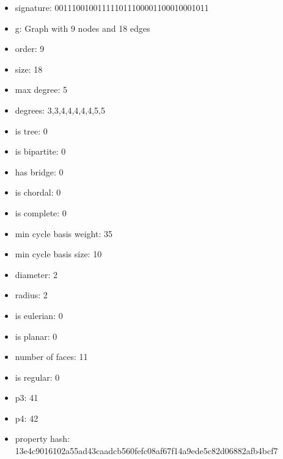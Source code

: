 \newpage
\begin{figure}
\end{figure}
\begin{itemize}
\item signature: 001110010011111011100001100010001011
\item g: Graph with 9 nodes and 18 edges
\item order: 9
\item size: 18
\item max degree: 5
\item degrees: 3,3,4,4,4,4,4,5,5
\item is tree: 0
\item is bipartite: 0
\item has bridge: 0
\item is chordal: 0
\item is complete: 0
\item min cycle basis weight: 35
\item min cycle basis size: 10
\item diameter: 2
\item radius: 2
\item is eulerian: 0
\item is planar: 0
\item number of faces: 11
\item is regular: 0
\item p3: 41
\item p4: 42
\item property hash: 13e4c9016102a55ad43caadcb560fefc08af67f14a9ede5c82d06882afb4bcf7
\end{itemize}
